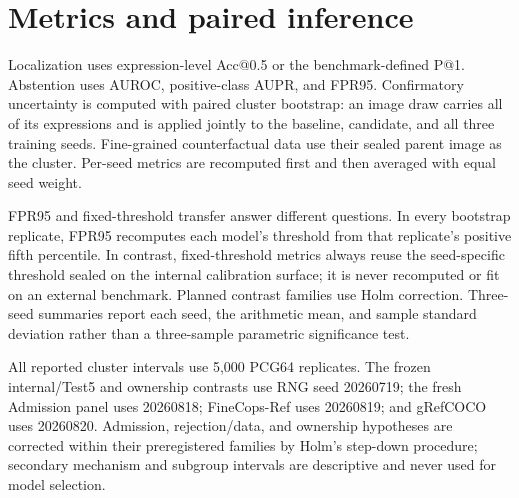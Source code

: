 \section{Metrics and paired inference}
\label{sup:statistics}

Localization uses expression-level Acc@0.5 or the benchmark-defined P@1.
Abstention uses AUROC, positive-class AUPR, and FPR95.  Confirmatory uncertainty
is computed with paired cluster bootstrap: an image draw carries all of its
expressions and is applied jointly to the baseline, candidate, and all three
training seeds.  Fine-grained counterfactual data use their sealed parent
image as the cluster.  Per-seed metrics are recomputed first and then averaged
with equal seed weight.

FPR95 and fixed-threshold transfer answer different questions.  In every
bootstrap replicate, FPR95 recomputes each model's threshold from that
replicate's positive fifth percentile.  In contrast, fixed-threshold metrics
always reuse the seed-specific threshold sealed on the internal calibration
surface; it is never recomputed or fit on an external benchmark.  Planned
contrast families use Holm correction.  Three-seed summaries report each
seed, the arithmetic mean, and sample standard deviation rather than a
three-sample parametric significance test.

All reported cluster intervals use 5,000 PCG64 replicates.  The frozen
internal/Test5 and ownership contrasts use RNG seed 20260719; the fresh
Admission panel uses 20260818; FineCops-Ref uses 20260819; and gRefCOCO uses
20260820.  Admission, rejection/data, and ownership hypotheses are corrected
within their preregistered families by Holm's step-down procedure; secondary
mechanism and subgroup intervals are descriptive and never used for model
selection.
